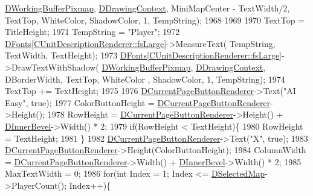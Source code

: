 \begin{DoxyCode}
      \hyperlink{classCApplicationData_afa34cf2780f38dd28c0c811e69d60a97}{DWorkingBufferPixmap}, \hyperlink{classCApplicationData_aa6c5bea9bdcc64398e5a3f693661d37c}{DDrawingContext}, MiniMapCenter - TextWidth/2, 
      TextTop, WhiteColor, ShadowColor, 1, TempString);
1968 
1969     
1970     TextTop = TitleHeight;
1971     TempString = \textcolor{stringliteral}{"Player"};
1972     \hyperlink{classCApplicationData_afde9247d0a3ea87393ec86dcdb1e8274}{DFonts}[\hyperlink{classCUnitDescriptionRenderer_a3ea4cd83b6dd9533ab3abb953a7da35aaf467097fe4f4811a5e2f1959c86e071d}{CUnitDescriptionRenderer::fsLarge}]->MeasureText(
      TempString, TextWidth, TextHeight);
1973     \hyperlink{classCApplicationData_afde9247d0a3ea87393ec86dcdb1e8274}{DFonts}[\hyperlink{classCUnitDescriptionRenderer_a3ea4cd83b6dd9533ab3abb953a7da35aaf467097fe4f4811a5e2f1959c86e071d}{CUnitDescriptionRenderer::fsLarge}]->DrawTextWithShadow(
      \hyperlink{classCApplicationData_afa34cf2780f38dd28c0c811e69d60a97}{DWorkingBufferPixmap}, \hyperlink{classCApplicationData_aa6c5bea9bdcc64398e5a3f693661d37c}{DDrawingContext}, DBorderWidth, TextTop, WhiteColor
      , ShadowColor, 1, TempString);
1974     TextTop += TextHeight;
1975     
1976     \hyperlink{classCApplicationData_abfe1743f2634b069ccc811db4a8733a8}{DCurrentPageButtonRenderer}->Text(\textcolor{stringliteral}{"AI Easy"}, \textcolor{keyword}{true});
1977     ColorButtonHeight = \hyperlink{classCApplicationData_abfe1743f2634b069ccc811db4a8733a8}{DCurrentPageButtonRenderer}->Height();
1978     RowHeight = \hyperlink{classCApplicationData_abfe1743f2634b069ccc811db4a8733a8}{DCurrentPageButtonRenderer}->Height() + 
      \hyperlink{classCApplicationData_a29a687c44dceb9e87a56d96612d59ab5}{DInnerBevel}->Width() * 2;
1979     \textcolor{keywordflow}{if}(RowHeight < TextHeight)\{
1980         RowHeight = TextHeight;
1981     \}
1982     \hyperlink{classCApplicationData_abfe1743f2634b069ccc811db4a8733a8}{DCurrentPageButtonRenderer}->Text(\textcolor{stringliteral}{"X"}, \textcolor{keyword}{true});
1983     \hyperlink{classCApplicationData_abfe1743f2634b069ccc811db4a8733a8}{DCurrentPageButtonRenderer}->Height(ColorButtonHeight);
1984     ColumnWidth = \hyperlink{classCApplicationData_abfe1743f2634b069ccc811db4a8733a8}{DCurrentPageButtonRenderer}->Width() + 
      \hyperlink{classCApplicationData_a29a687c44dceb9e87a56d96612d59ab5}{DInnerBevel}->Width() * 2;
1985     MaxTextWidth = 0;
1986     \textcolor{keywordflow}{for}(\textcolor{keywordtype}{int} Index = 1; Index <= \hyperlink{classCApplicationData_abf74a18394e479b7090a8f9a55608867}{DSelectedMap}->PlayerCount(); Index++)\{

\end{DoxyCode}
